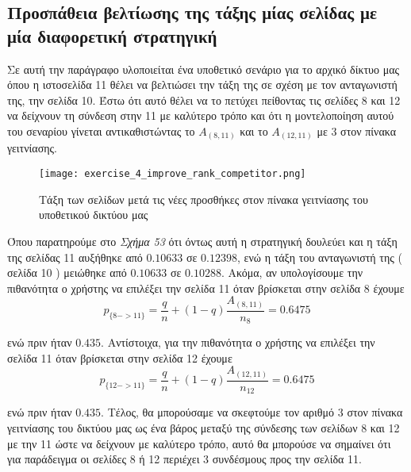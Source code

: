 \documentclass[First Project.tex]{subfiles}
\begin{document}
\subsection{ Προσπάθεια βελτίωσης της τάξης μίας σελίδας με μία διαφορετική στρατηγική }

Σε αυτή την παράγραφο υλοποιείται ένα υποθετικό σενάριο για το αρχικό δίκτυο μας όπου η ιστοσελίδα 11 θέλει να
βελτιώσει την τάξη της σε σχέση με τον ανταγωνιστή της, την σελίδα 10. Έστω ότι αυτό θέλει να το πετύχει
πείθοντας τις σελίδες 8 και 12 να δείχνουν τη σύνδεση στην 11 με καλύτερο τρόπο και ότι η μοντελοποίηση αυτού 
του σεναρίου γίνεται αντικαθιστώντας το $A_{(8,11)}$ και το $Α_{(12,11)}$ με 3 στον πίνακα γειτνίασης. 

\begin{figure}[h!]
    \centering
    \captionsetup{justification=centering}
    \begin{center}
        \texttt{[image: exercise\_4\_improve\_rank\_competitor.png]}    
        \caption{ Τάξη των σελίδων μετά τις νέες προσθήκες στον πίνακα γειτνίασης του υποθετικού δικτύου μας }
    \end{center}
\end{figure} 

Όπου παρατηρούμε στο \textit{Σχήμα 53} ότι όντως αυτή η στρατηγική δουλεύει και η τάξη της σελίδας 11 αυξήθηκε από $0.10633$ σε 
$0.12398$, ενώ η τάξη του ανταγωνιστή της ( σελίδα 10 ) μειώθηκε από $0.10633$ σε $0.10288$. Ακόμα, αν υπολογίσουμε την πιθανότητα ο χρήστης 
να επιλέξει την σελίδα 11 όταν βρίσκεται στην σελίδα 8 έχουμε 
\begin{equation*}
    p_{\{8->11\}} = \frac{q}{n} + (1-q)\frac{A_{(8,11)}}{n_{8}} = 0.6475
\end{equation*}

ενώ πριν ήταν $0.435$. Αντίστοιχα, για την πιθανότητα ο χρήστης να επιλέξει την σελίδα 11 όταν βρίσκεται στην σελίδα 12 έχουμε
\begin{equation*}
    p_{\{12->11\}} = \frac{q}{n} + (1-q)\frac{A_{(12,11)}}{n_{12}} = 0.6475
\end{equation*}

ενώ πριν ήταν $0.435$. Τέλος, θα μπορούσαμε να σκεφτούμε τον αριθμό 3 στον πίνακα γειτνίασης του δικτύου μας ως ένα βάρος μεταξύ της σύνδεσης
των σελίδων 8 και 12 με την 11 ώστε να δείχνουν με καλύτερο τρόπο, αυτό θα μπορούσε να σημαίνει ότι για παράδειγμα οι σελίδες 8 ή 12 περιέχει 3
συνδέσμους προς την σελίδα 11.
\end{document}

